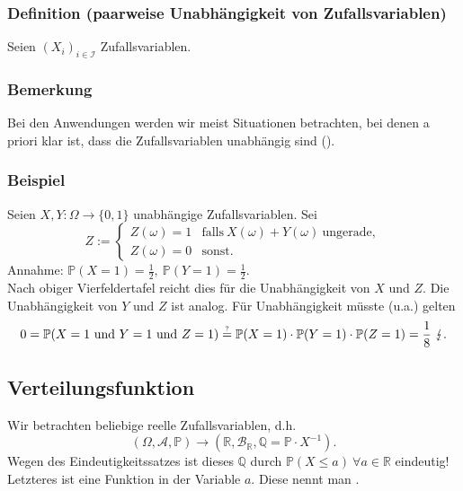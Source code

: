 \subsubsection{Definition (paarweise Unabh\"angigkeit von Zufallsvariablen)}
Seien $(X_i)_{i\in\mathcal{I}}$ Zufallsvariablen.
\subsubsection{Bemerkung}
Bei den Anwendungen werden wir meist Situationen betrachten, bei denen a priori klar ist, dass die Zufallsvariablen unabh\"angig sind ().
\subsubsection{Beispiel}
Seien $X,Y\colon\Omega\to\{0,1\}$ unabh\"angige Zufallsvariablen. Sei
\[Z:=\begin{cases}Z(\omega)=1&\text{falls}\ X(\omega)+Y(\omega)\ \text{ungerade},\\Z(\omega)=0&\text{sonst.}\end{cases}\]
Annahme: $\mathbb{P}(X=1)=\frac{1}{2},\ \mathbb{P}(Y=1)=\frac{1}{2}$.\\
Nach obiger Vierfeldertafel reicht dies f\"ur die Unabh\"angigkeit von $X$ und $Z$. Die Unabh\"angigkeit von $Y$ und $Z$ ist analog. F\"ur Unabh\"angigkeit m\"usste (u.a.) gelten
\[0=\mathbb{P}(X=1\ \text{und}\ Y=1\ \text{und}\ Z=1)\textabove{?}{=}\mathbb{P}(X=1)\cdot\mathbb{P}(Y=1)\cdot\mathbb{P}(Z=1)=\frac{1}{8}\ \lightning.\]
\subsection{Verteilungsfunktion}
Wir betrachten beliebige reelle Zufallsvariablen, d.h.
\[(\Omega,\mathcal{A},\mathbb{P})\to(\mathbb{R},\mathcal{B}_\mathbb{R},\mathbb{Q}=\mathbb{P}\cdot X^{-1}).\]
Wegen des Eindeutigkeitssatzes ist dieses $\mathbb{Q}$ durch $\mathbb{P}(X\leq a)\ \forall a\in\mathbb{R}$ eindeutig! Letzteres ist eine Funktion in der Variable $a$. Diese nennt man .
